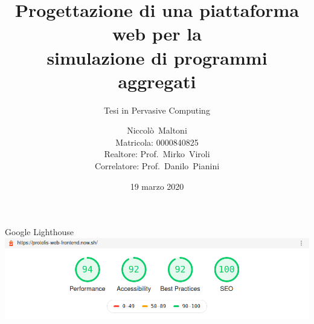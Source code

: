 \documentclass[
  usepdftitle=false,
  bigger,
  aspectratio=169,
  lualatex,
  italian
]{beamer}
\title[WebProtelis]{%
  Progettazione di una piattaforma web per la\\simulazione di programmi aggregati%
}
\subtitle{Tesi in Pervasive Computing}
\author[Niccolò~Maltoni (0000840825)]{%
  Niccolò~Maltoni%
  \\\small{Matricola: 0000840825}%
  \\\vspace{10pt} \small{Realtore: Prof.~Mirko~Viroli \\Correlatore: Prof.~Danilo~Pianini}
}
\institute[]{Alma Mater Studiorum - Università di Bologna}
\date{19 marzo 2020}
\begin{document}
  \frame{\titlepage}


  
  
  
  

  \begin{frame}[noframenumbering]
    \titlepage
  \end{frame}

  \begin{frame}[noframenumbering]{Google Lighthouse}
    \includegraphics[width=\textwidth]{../res/tests/Screenshot_2020-03-04 Lighthouse Report Viewer.png}
  \end{frame}

\end{document}
